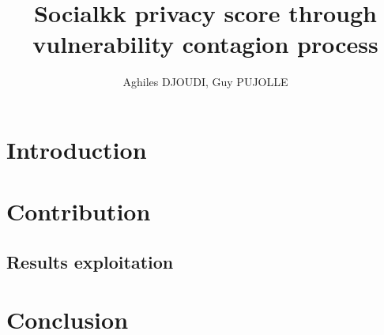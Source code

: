\documentclass[8pt]{beamer}
\begin{document}
\title{Socialkk privacy score through vulnerability contagion process}
\author{Aghiles DJOUDI, Guy PUJOLLE}

\firstpage

\section{Introduction}
	
	
	
	
	

\tableofcontent

\section{Contribution}
		
		
		
		
		
		
	\subsection{Results exploitation}
		
		
		
\section{Conclusion}
	


\frameBibliography
\end{document}
